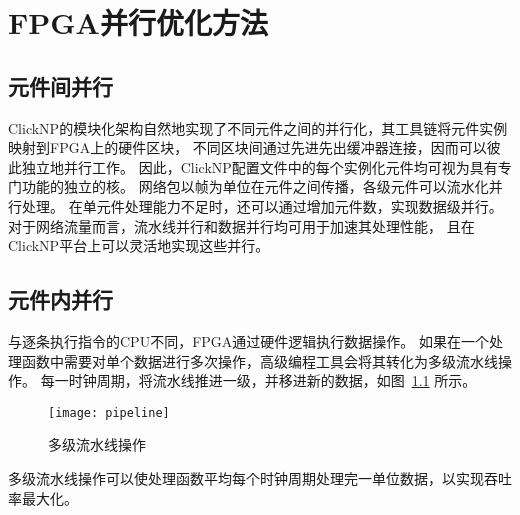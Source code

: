 \chapter{FPGA并行优化方法}
\section{元件间并行}
ClickNP的模块化架构自然地实现了不同元件之间的并行化，其工具链将元件实例映射到FPGA上的硬件区块，
不同区块间通过先进先出缓冲器连接，因而可以彼此独立地并行工作。
因此，ClickNP配置文件中的每个实例化元件均可视为具有专门功能的独立的核。
网络包以帧为单位在元件之间传播，各级元件可以流水化并行处理。
在单元件处理能力不足时，还可以通过增加元件数，实现数据级并行。
对于网络流量而言，流水线并行和数据并行均可用于加速其处理性能，
且在ClickNP平台上可以灵活地实现这些并行。

\section{元件内并行}
与逐条执行指令的CPU不同，FPGA通过硬件逻辑执行数据操作。
如果在一个处理函数中需要对单个数据进行多次操作，高级编程工具会将其转化为多级流水线操作。
每一时钟周期，将流水线推进一级，并移进新的数据，如图~\ref{fig:pipeline} 所示。

\begin{figure}[htbp]
\centering
\texttt{[image: pipeline]}
\caption{多级流水线操作} \label{fig:pipeline}
\end{figure}

多级流水线操作可以使处理函数平均每个时钟周期处理完一单位数据，以实现吞吐率最大化。
